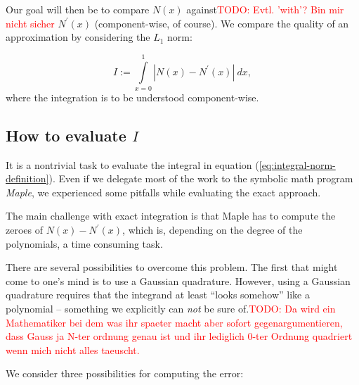 \documentclass{article}
\newcommand{\todo}[2][]{\textcolor{red}{TODO\ifthenelse{\equal{#1}{}}{}{[#1]}: #2}}
\begin{document}
Our goal will then be to compare $N\left(x\right)$ against\todo{Evtl. 'with'? Bin mir nicht sicher} $N^\prime\left(x\right)$ (component-wise, of course). We compare the quality of an approximation by considering the $L_1$ norm:

\begin{equation}
  \label{eq:integral-norm-definition}
  I := \int\limits_{x=0}^1 | N\left(x\right) - N^\prime\left(x\right) |\  dx,
\end{equation}
where the integration is to be understood component-wise.

\subsection{\texorpdfstring{How to evaluate $I$}{How to evaluate I}}
\label{sec:how-to-eval-I}

It is a nontrivial task to evaluate the integral in equation (\ref{eq:integral-norm-definition}). Even if we delegate most of the work to the symbolic math program \emph{Maple}, we experienced some pitfalls while evaluating the exact approach.

The main challenge with exact integration is that Maple has to compute the zeroes of $N\left(x\right)-N^\prime\left(x\right)$, which is, depending on the degree of the polynomials, a time consuming task.

There are several possibilities to overcome this problem. The first that might come to one's mind is to use a Gaussian quadrature. However, using a Gaussian quadrature requires that the integrand at least ``looks somehow'' like a polynomial -- something we explicitly can \emph{not} be sure of.\todo{Da wird ein Mathematiker bei dem was ihr spaeter macht aber sofort gegenargumentieren, dass Gauss ja N-ter ordnung genau ist und ihr lediglich 0-ter Ordnung quadriert wenn mich nicht alles taeuscht.}

We consider three possibilities for computing the error:
\end{document}
